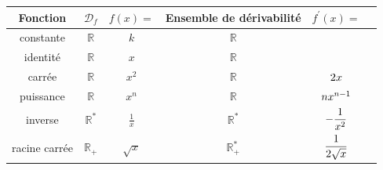 \documentclass[12pt]{article}
\theoremstyle{break}
\begin{document}
\begin{proposition}{}{}
\begin{center}
  \renewcommand{\arraystretch}{3.6}
  \setlength{\extrarowheight}{-3pt}
  \centering
  \begin{tabular}{|c|c|c|c|c|N}
  \hline
  Fonction & $\mathcal{D}_{f}$ & $f(x)=$ & Ensemble de dérivabilité & $f^{\prime}(x)=$ &\\
  \hline
  constante & $\mathbb{R}$ & $k$ & $\mathbb{R}$ &  &\\
  \hline
  identité & $\mathbb{R}$ & $x$ & $\mathbb{R}$ &  &\\
  \hline
  carrée & $\mathbb{R}$ & $x^{2}$ & $\mathbb{R}$ & $2 x$ &\\
  \hline
  puissance & $\mathbb{R}$ & $x^{n}$ & $\mathbb{R}$ & $n x^{n-1}$ &\\
  \hline
  inverse & $\mathbb{R}^{*}$ & $\frac{1}{x}$ & $\mathbb{R}^{*}$ & $-\dfrac{1}{x^{2}}$ &\\
  \hline
  racine carrée & $\mathbb{R}_{+}$ & $\sqrt{x}$ & $\mathbb{R}_{+}^{*}$ & $\dfrac{1}{2 \sqrt{x}}$ &\\
  \hline
  \end{tabular}
\end{center}
\end{proposition}

\newpage
\end{document}
